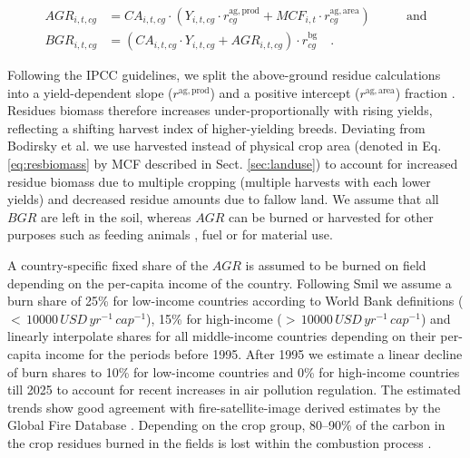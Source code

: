 \documentclass[gc, manuscript]{copernicus}
\begin{document}
\begin{equation}
\begin{aligned}
AGR_{i,t,cg} & = CA_{i,t,cg} \cdot \left( Y_{i,t,cg} \cdot  r^{\mathrm{ag,prod}}_{cg} + MCF_{i,t} \cdot r^{\mathrm{ag,area}}_{cg} \right)
\qquad & \textrm{and} \\
BGR_{i,t,cg} & = (CA_{i,t,cg} \cdot Y_{i,t,cg} + AGR_{i,t,cg}) \cdot r^{\mathrm{bg}}_{cg} \quad.
\label{eq:resbiomass}
\end{aligned}
\end{equation}

Following the IPCC guidelines, we split the above-ground residue calculations into a yield-dependent slope (\(r^{\mathrm{ag,prod}}\)) and a positive intercept (\(r^{\mathrm{ag,area}}\)) fraction \citep{hergoualch_n2o_in_ipcc_2019}. Residues biomass therefore increases under-proportionally with rising yields, reflecting a shifting harvest index of higher-yielding breeds.
Deviating from Bodirsky et al. \citeyearpar{bodirsky_n2o_2012} we use harvested instead of physical crop area (denoted in Eq. \eqref{eq:resbiomass} by MCF described in Sect. \ref{sec:landuse}) to account for increased residue biomass due to multiple cropping (multiple harvests with each lower yields) and decreased residue amounts due to fallow land. We assume that all \(BGR\) are left in the soil, whereas \(AGR\) can be burned or harvested for other purposes such as feeding animals \citep{weindl_livestock_2017}, fuel or for material use.

A country-specific fixed share of the \(AGR\) is assumed to be burned on field depending on the per-capita income of the country. Following Smil \citeyearpar{smil_nitrogen_1999} we assume a burn share of 25\% for low-income countries according to World Bank definitions (\(<\,10000\,\unit{USD}\,\unit{yr}^{-1}\,\unit{cap}^{-1}\)), 15\% for high-income (\(>\,10000\,\unit{USD}\,\unit{yr}^{-1}\,\unit{cap}^{-1}\)) and linearly interpolate shares for all middle-income countries depending on their per-capita income for the periods before 1995. After 1995 we estimate a linear decline of burn shares to 10\% for low-income countries and 0\% for high-income countries till 2025 to account for recent increases in air pollution regulation. The estimated trends show good agreement with fire-satellite-image derived estimates by the Global Fire Database \citep{vanderWerf_fire_2017}. Depending on the crop group, 80--90\% of the carbon in the crop residues burned in the fields is lost within the combustion process \citep{eggleston_ipcc_2006}.
\end{document}

